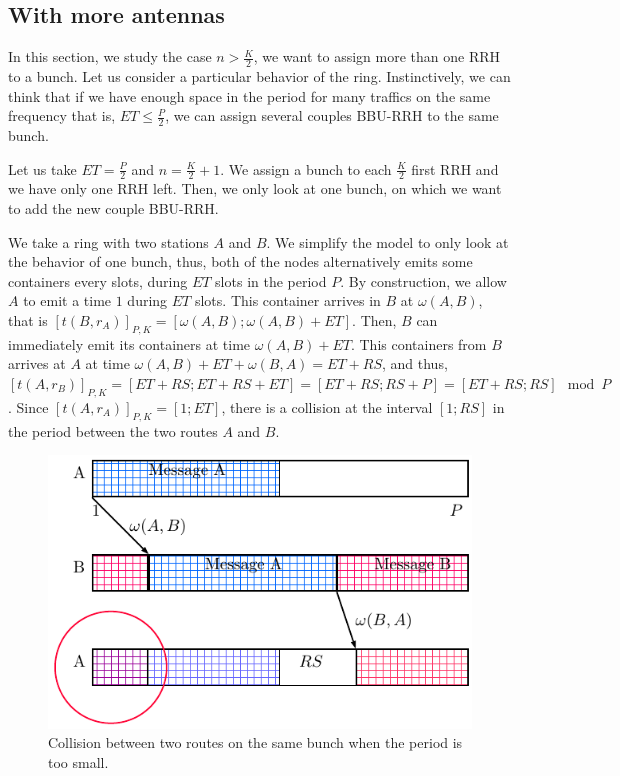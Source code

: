 \documentclass[]{algotel}
\begin{document}
\subsection{With more antennas}
\label{sec:optialgo}
 In this section, we study the case $n > \frac{K}{2}$, we want to assign more than one RRH to a bunch. 
 Let us consider a particular behavior of the ring. Instinctively, we can think that if we have enough space in the period for many traffics on the same frequency that is, $ET \le \frac{P}{2}$, we can assign several couples BBU-RRH to the same bunch.

 Let us take $ET =  \frac{P}{2}$ and $n = \frac{K}{2} + 1$. We assign a bunch to each $\frac{K}{2}$ first RRH and we have only one RRH left. Then, we only look at one bunch, on which we want to add the new couple BBU-RRH. 
 
 We take a ring with two stations $A$ and $B$. We simplify the model to only look at the behavior of one bunch, thus, both of the nodes alternatively emits some containers every slots, during $ET$ slots in the period $P$. By construction, we allow $A$ to emit a time $1$ during $ET$ slots. This container arrives in $B$ at $\omega(A,B)$, that is  $[t(B,r_A)]_{P,K} = [\omega(A,B);\omega(A,B)+ET]$. Then, $B$ can immediately emit its containers at time $\omega(A,B)+ET$. This containers from $B$ arrives at $A$ at time $\omega(A,B)+ET + \omega(B,A) = ET + RS$, and thus, $[t(A,r_B)]_{P,K} = [ET + RS;ET + RS + ET] = [ET+RS; RS + P] = [ET + RS; RS] \mod P$. Since $[t(A,r_A)]_{P,K} = [1;ET]$, there is a collision at the interval $[1;RS]$ in the period between the two routes $A$ and $B$.
  \begin{figure}[h]
\centering
      \includegraphics[scale=0.7]{rs.pdf}
     \caption{Collision between two routes on the same bunch when the period is too small.}   \label{fig:proofrs}
  \end{figure}
\end{document}
